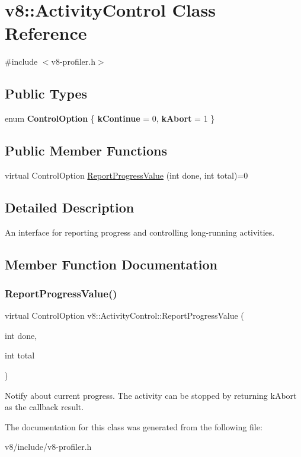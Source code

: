 \hypertarget{classv8_1_1ActivityControl}{}\section{v8\+:\+:Activity\+Control Class Reference}
\label{classv8_1_1ActivityControl}


{\ttfamily \#include $<$v8-\/profiler.\+h$>$}

\subsection*{Public Types}
\begin{DoxyCompactItemize}
\item 
\mbox{\label{classv8_1_1ActivityControl_a6d261e8c21e8076ce86b4add231a8ef9}} 
enum {\bfseries Control\+Option} \{ {\bfseries k\+Continue} = 0, 
{\bfseries k\+Abort} = 1
 \}
\end{DoxyCompactItemize}
\subsection*{Public Member Functions}
\begin{DoxyCompactItemize}
\item 
virtual Control\+Option \mbox{\hyperlink{classv8_1_1ActivityControl_a1300f10611306a3e8f79239e057eb0bf}{Report\+Progress\+Value}} (int done, int total)=0
\end{DoxyCompactItemize}


\subsection{Detailed Description}
An interface for reporting progress and controlling long-\/running activities. 

\subsection{Member Function Documentation}
\mbox{\label{classv8_1_1ActivityControl_a1300f10611306a3e8f79239e057eb0bf}} 
\subsubsection{\texorpdfstring{Report\+Progress\+Value()}{ReportProgressValue()}}
{\footnotesize\ttfamily virtual Control\+Option v8\+::\+Activity\+Control\+::\+Report\+Progress\+Value (\begin{DoxyParamCaption}\item[{int}]{done,  }\item[{int}]{total }\end{DoxyParamCaption})\hspace{0.3cm}{\ttfamily [pure virtual]}}

Notify about current progress. The activity can be stopped by returning k\+Abort as the callback result. 

The documentation for this class was generated from the following file\+:\begin{DoxyCompactItemize}
\item 
v8/include/v8-\/profiler.\+h\end{DoxyCompactItemize}
